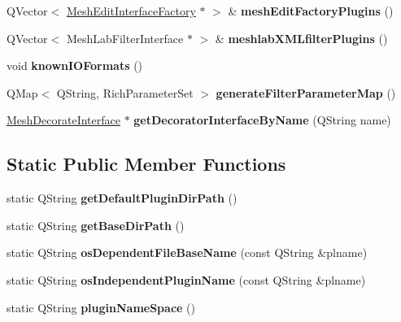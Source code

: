 \begin{DoxyCompactItemize}
Q\+Vector$<$ \hyperlink{class_mesh_edit_interface_factory}{Mesh\+Edit\+Interface\+Factory} $\ast$ $>$ \& {\bfseries mesh\+Edit\+Factory\+Plugins} ()
\item 
\mbox{\label{class_plugin_manager_ace0742d5d398251e781fc8c2cddc5846}} 
Q\+Vector$<$ Mesh\+Lab\+Filter\+Interface $\ast$ $>$ \& {\bfseries meshlab\+X\+M\+Lfilter\+Plugins} ()
\item 
\mbox{\label{class_plugin_manager_a8beb704d44a1fb060f1d723e762526e6}} 
void {\bfseries known\+I\+O\+Formats} ()
\item 
\mbox{\label{class_plugin_manager_a504bc51b8b3f42b69d0b5408a69db8b7}} 
Q\+Map$<$ Q\+String, Rich\+Parameter\+Set $>$ {\bfseries generate\+Filter\+Parameter\+Map} ()
\item 
\mbox{\label{class_plugin_manager_a44da159f0d06930e73677c4ab2318274}} 
\hyperlink{class_mesh_decorate_interface}{Mesh\+Decorate\+Interface} $\ast$ {\bfseries get\+Decorator\+Interface\+By\+Name} (Q\+String name)
\end{DoxyCompactItemize}
\subsection*{Static Public Member Functions}
\begin{DoxyCompactItemize}
\item 
\mbox{\label{class_plugin_manager_a54b75e678adc5940e05996a023194971}} 
static Q\+String {\bfseries get\+Default\+Plugin\+Dir\+Path} ()
\item 
\mbox{\label{class_plugin_manager_a654e374014b41b4c803c014730b1ea52}} 
static Q\+String {\bfseries get\+Base\+Dir\+Path} ()
\item 
\mbox{\label{class_plugin_manager_abf646dde310d1153405afeee0949cb63}} 
static Q\+String {\bfseries os\+Dependent\+File\+Base\+Name} (const Q\+String \&plname)
\item 
\mbox{\label{class_plugin_manager_aa625fa0a7a37247aa14ff839134017fe}} 
static Q\+String {\bfseries os\+Independent\+Plugin\+Name} (const Q\+String \&plname)
\item 
\mbox{\label{class_plugin_manager_a80acccabd6d2dbcc7bf4391c27ff2b58}} 
static Q\+String {\bfseries plugin\+Name\+Space} ()
\end{DoxyCompactItemize}
